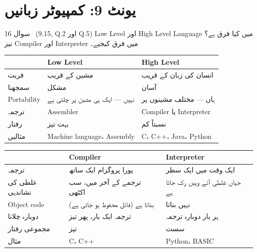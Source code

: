 \section*{یونٹ \textenglish{9}: کمپیوٹر زبانیں}

\begin{sawal}{سوال \textenglish{16} \ \textnormal{\small(\textenglish{9.15, Q.2} اور \textenglish{Q.5})}}
\textenglish{Low Level} اور \textenglish{High Level Language} میں کیا فرق ہے؟
نیز \textenglish{Compiler} اور \textenglish{Interpreter} میں فرق کیجیے۔
\end{sawal}

\begin{hal}
\begin{center}
\begin{tabular}{@{}p{2.8cm} p{5.6cm} p{6.0cm}@{}}
\toprule
 & \textbf{\textenglish{Low Level}} & \textbf{\textenglish{High Level}} \\
\midrule
قربت & مشین کے قریب & انسان کی زبان کے قریب \\
سمجھنا & مشکل & آسان \\
\textenglish{Portability} & نہیں --- ایک ہی مشین پر چلتی ہے & ہاں --- مختلف مشینوں پر \\
ترجمہ & \textenglish{Assembler} & \textenglish{Compiler} یا \textenglish{Interpreter} \\
رفتار & بہت تیز & نسبتاً کم \\
مثالیں & \textenglish{Machine language}، \textenglish{Assembly} & \textenglish{C}، \textenglish{C++}، \textenglish{Java}، \textenglish{Python} \\
\bottomrule
\end{tabular}
\end{center}

\medskip
\begin{center}
\begin{tabular}{@{}p{2.8cm} p{5.6cm} p{6.0cm}@{}}
\toprule
 & \textbf{\textenglish{Compiler}} & \textbf{\textenglish{Interpreter}} \\
\midrule
ترجمہ & پورا پروگرام ایک ساتھ & ایک وقت میں ایک سطر \\
غلطی کی نشاندہی & ترجمے کے آخر میں، سب اکٹھی & جہاں غلطی آئے وہیں رک جاتا ہے \\
\textenglish{Object code} & بناتا ہے (فائل محفوظ ہو جاتی ہے) & نہیں بناتا \\
دوبارہ چلانا & ترجمہ ایک بار، پھر تیز & ہر بار دوبارہ ترجمہ \\
مجموعی رفتار & تیز & سست \\
مثال & \textenglish{C}، \textenglish{C++} & \textenglish{Python}، \textenglish{BASIC} \\
\bottomrule
\end{tabular}
\end{center}

\end{hal}
